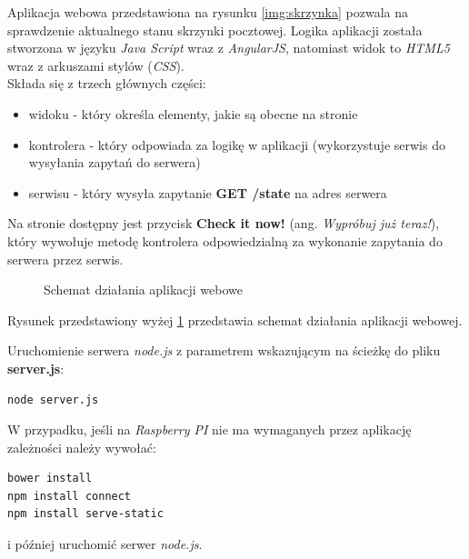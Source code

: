 Aplikacja webowa przedstawiona na rysunku \ref{img:skrzynka} pozwala na sprawdzenie aktualnego stanu skrzynki pocztowej.
Logika aplikacji została stworzona w języku \textit{Java Script} wraz z \textit{AngularJS}, natomiast widok to \textit{HTML5} wraz z arkuszami stylów (\textit{CSS}).\\

Składa się z trzech głównych części:
\begin{itemize}
\item widoku - który określa elementy, jakie są obecne na stronie
\item kontrolera - który odpowiada za logikę w aplikacji (wykorzystuje serwis do wysyłania zapytań do serwera)
\item serwisu - który wysyła zapytanie \textbf{GET /state} na adres serwera
\end{itemize}

Na stronie dostępny jest przycisk \textbf{Check it now!} (ang. \textit{Wypróbuj już teraz!}), który wywołuje metodę kontrolera odpowiedzialną za wykonanie zapytania do serwera przez serwis.

\begin{figure}[H]
	\label{img:web_diagram}
	\caption{Schemat działania aplikacji webowe}
\end{figure}

Rysunek przedstawiony wyżej \ref{img:web_diagram} przedstawia schemat działania aplikacji webowej.

Uruchomienie serwera \textit{node.js} z parametrem wskazującym na ścieżkę do pliku \textbf{server.js}:
\begin{lstlisting}
node server.js
\end{lstlisting}

W przypadku, jeśli na \textit{Raspberry PI} nie ma wymaganych przez aplikację zależności należy wywołać:
\begin{lstlisting}
bower install
npm install connect
npm install serve-static
\end{lstlisting}
i później uruchomić serwer \textit{node.js}.
%

